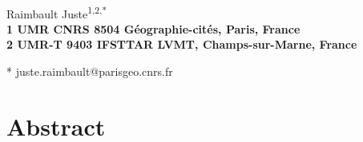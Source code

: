 \documentclass[10pt,letterpaper]{article}
\date{}
\begin{document}
\vspace*{0.35in}

\begin{flushleft}
{\Large\textbf{}
}
\newline
\\
Raimbault Juste\textsuperscript{1,2,*}
\\
\bigskip
\bf{1} UMR CNRS 8504 G{\'e}ographie-cit{\'e}s, Paris, France
\\
\bigskip
\bf{2} UMR-T 9403 IFSTTAR LVMT, Champs-sur-Marne, France

% 
%





* juste.raimbault@parisgeo.cnrs.fr

\end{flushleft}
\section*{Abstract}
\end{document}

